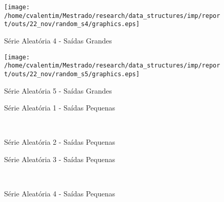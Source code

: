 \documentclass[12pt]{article}
\begin{document}
\begin{figure}
\begin{center}
\texttt{[image: /home/cvalentim/Mestrado/research/data\_structures/imp/report/outs/22\_nov/random\_s4/graphics.eps]}
\caption{Série Aleatória 4 - Saídas Grandes}
\end{center}
\end{figure}

\begin{figure}
\begin{center}
\texttt{[image: /home/cvalentim/Mestrado/research/data\_structures/imp/report/outs/22\_nov/random\_s5/graphics.eps]}
\caption{Série Aleatória 5 - Saídas Grandes}
\end{center}
\end{figure}

\clearpage
\begin{figure}
\begin{center}

\caption{Série Aleatória 1 - Saídas Pequenas}
\label{1-small-random}
\end{center}
\end{figure}

\begin{figure}
\begin{center}
\\
\caption{Série Aleatória 2 - Saídas Pequenas}
\label{2-small-random}
\end{center}
\end{figure}


\begin{figure}
\begin{center}

\label{3-small-random}
\caption{Série Aleatória 3 - Saídas Pequenas}
\end{center}
\end{figure}

\begin{figure}
\begin{center}
 \\
\label{4-small-random}
\caption{Série Aleatória 4 - Saídas Pequenas}
\end{center}
\end{figure}
\end{document}
